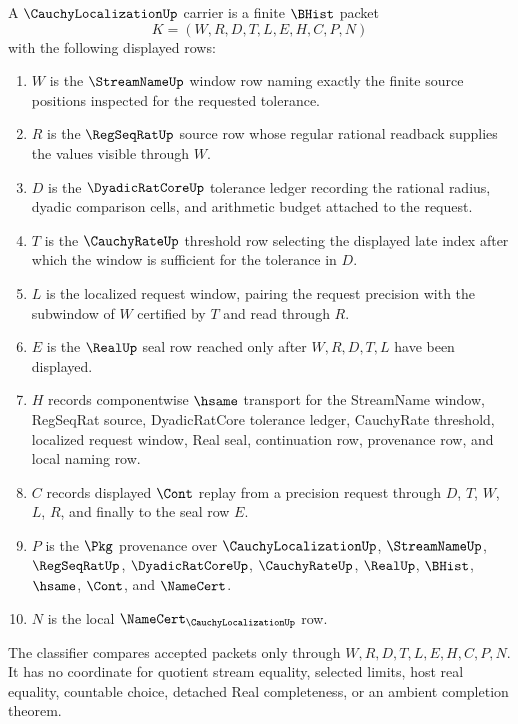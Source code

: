 \begin{definition}
\label{def:cauchy-localization-carrier}
A $\CauchyLocalizationUp$ carrier is a finite $\BHist$ packet
$$
K=(W,R,D,T,L,E,H,C,P,N)
$$
with the following displayed rows:
\begin{enumerate}
\item $W$ is the $\StreamNameUp$ window row naming exactly the finite source positions inspected for the requested tolerance.
\item $R$ is the $\RegSeqRatUp$ source row whose regular rational readback supplies the values visible through $W$.
\item $D$ is the $\DyadicRatCoreUp$ tolerance ledger recording the rational radius, dyadic comparison cells, and arithmetic budget attached to the request.
\item $T$ is the $\CauchyRateUp$ threshold row selecting the displayed late index after which the window is sufficient for the tolerance in $D$.
\item $L$ is the localized request window, pairing the request precision with the subwindow of $W$ certified by $T$ and read through $R$.
\item $E$ is the $\RealUp$ seal row reached only after $W,R,D,T,L$ have been displayed.
\item $H$ records componentwise $\hsame$ transport for the StreamName window, RegSeqRat source, DyadicRatCore tolerance ledger, CauchyRate threshold, localized request window, Real seal, continuation row, provenance row, and local naming row.
\item $C$ records displayed $\Cont$ replay from a precision request through $D$, $T$, $W$, $L$, $R$, and finally to the seal row $E$.
\item $P$ is the $\Pkg$ provenance over $\CauchyLocalizationUp$, $\StreamNameUp$, $\RegSeqRatUp$, $\DyadicRatCoreUp$, $\CauchyRateUp$, $\RealUp$, $\BHist$, $\hsame$, $\Cont$, and $\NameCert$.
\item $N$ is the local $\NameCert_{\CauchyLocalizationUp}$ row.
\end{enumerate}
The classifier compares accepted packets only through $W,R,D,T,L,E,H,C,P,N$. It has no coordinate for quotient stream equality, selected limits, host real equality, countable choice, detached Real completeness, or an ambient completion theorem.
\end{definition}

